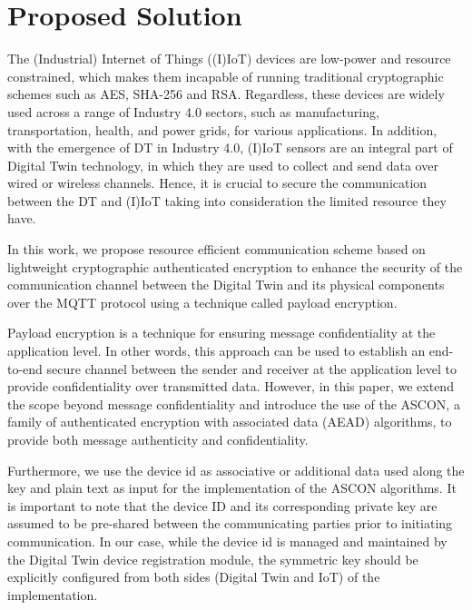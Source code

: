 

\section{Proposed Solution  }
\label{sec:prosolution}

The (Industrial) Internet of Things ((I)IoT) devices are low-power and resource constrained, which makes them incapable of running traditional cryptographic
schemes such as AES, SHA-256 and RSA. Regardless, these devices are widely used across a range of Industry 4.0 sectors, such as manufacturing, transportation, health, and power
grids, for various applications. In addition, with the emergence of DT in Industry 4.0, (I)IoT sensors are an integral part of Digital Twin technology, in which they are used to collect and send data over wired or wireless channels. Hence, it is crucial to secure the communication between the DT and (I)IoT taking into consideration the limited resource they have. 


In this work, we propose resource efficient communication scheme based on lightweight cryptographic authenticated encryption to enhance the security of the communication channel
between the Digital Twin and its physical components over the MQTT protocol using a technique called payload encryption.



Payload encryption is a technique for ensuring message confidentiality at the application level. In other words, this approach can be used to establish an end-to-end secure channel between the sender and receiver at the application level to provide confidentiality over transmitted data. However, in this paper, we extend the scope beyond message confidentiality and introduce the use of the ASCON, a family of authenticated encryption with associated data (AEAD) algorithms, to provide both message authenticity and confidentiality.

Furthermore, we use the device id as associative or additional data used along the key and plain text as input for the implementation of the ASCON algorithms. It is important to note that the device ID and its corresponding private key are assumed to be pre-shared between the communicating parties prior to initiating communication. In our case, while the device id is managed and maintained by the Digital Twin device registration module, the symmetric key should be explicitly configured from both sides (Digital Twin and IoT) of the implementation.  

